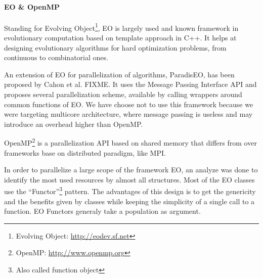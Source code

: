 \documentclass{sig-alternate}
\newcommand{\DAEYAHSP}{{\sc DaE$_{\text{YAHSP}}$}}
\begin{document}
\paragraph{EO \& OpenMP} %


Standing for Evolving Object\footnote{Evolving Object:
\url{http://eodev.sf.net}}, EO is largely used and known framework in
evolutionary computation based on template approach in C++. It helps at
designing evolutionary algorithms for hard optimization problems, from
continuous to combinatorial ones.

An extension of EO for parallelization of algorithms, ParadisEO, has been
proposed by Cahon et al. FIXME. It uses the Message Passing Interface API and
proposes several parallelization scheme, available by calling wrappers around
common functions of EO. We have choose not to use this framework because we
were targeting multicore architecture, where message passing is useless and may
introduce an overhead higher than OpenMP.


OpenMP\footnote{OpenMP: \url{http://www.openmp.org}} is a parallelization API
based on shared memory that differs from over frameworks base on distributed
paradigm, like MPI.


In order to parallelize a large scope of the framework EO, an analyze was done
to identify the most used resources by almost all structures. Most of the EO
classes use the ``Functor''\footnote{Also called function object} pattern. The
advantages of this design is to get the genericity and the benefits given by
classes while keeping the simplicity of a single call to a function. EO Functors
generaly take a population as argument.
\end{document}
